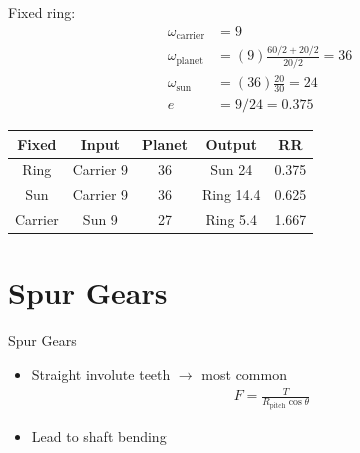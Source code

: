 \documentclass[
10pt,
a4paper,
openany,
svgnames,
]{book}
\begin{document}

\begin{example}
\end{example}

\begin{solution}
  Fixed ring: \\
  \begin{align*}
    \omega_{\text{carrier}} &= 9 \\
    \omega_{\text{planet}} &= (9) \frac{60/2 + 20/2}{20/2} = 36 \\
    \omega_{\text{sun}} &= (36) \frac{20}{30} = 24 \\
    e &= 9/24 = 0.375
  \end{align*}

  \begin{table}[H]
    \centering
    \begin{tabular}{ccccc}
      \toprule
      Fixed & Input & Planet & Output & RR \\
      \midrule
      Ring & Carrier 9 & 36 & Sun 24 & 0.375 \\
      Sun & Carrier 9 & 36 & Ring 14.4 & 0.625 \\
      Carrier & Sun 9 & 27 & Ring 5.4 & 1.667 \\
      \bottomrule
    \end{tabular}
  \end{table}
\end{solution}

\section{Spur Gears}

\begin{frame}{Spur Gears}
  \begin{figure}[htbp]
    \centering
  \end{figure}
  \begin{itemize}
    \item Straight involute teeth $\rightarrow$ most common
          \begin{align*}
            F = \frac{T}{R_{\text{pitch}} \cos \theta}
          \end{align*}
    \item Lead to shaft bending
  \end{itemize}
\end{frame}
\end{document}
